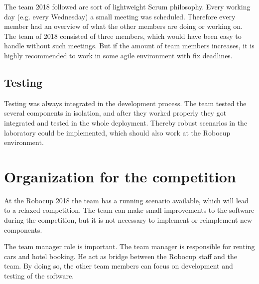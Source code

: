 The team 2018 followed are sort of lightweight Scrum philosophy. Every working day (e.g. every Wednesday) a small meeting was scheduled. Therefore every member had an overview of what the other members are doing or working on. The team of 2018 consisted of three members, which would have been easy to handle without such meetings. But if the amount of team members increases, it is highly recommended to work in some agile environment with fix deadlines.

\subsection{Testing}

Testing was always integrated in the development process. The team tested the several components in isolation, and after they worked properly they got integrated and tested in the whole deployment. Thereby robust scenarios in the laboratory could be implemented, which should also work at the Robocup environment.


\section{Organization for the competition}

At the Robocup 2018 the team has a running scenario available, which will lead to a relaxed competition. The team can make small improvements to the software during the competition, but it is not necessary to implement or reimplement new components.

The team manager role is important. The team manager is responsible for renting cars and hotel booking. He act as bridge between the Robocup staff and the team. By doing so, the other team members can focus on development and testing of the software.
